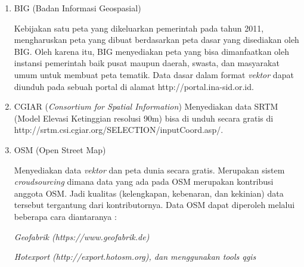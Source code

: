 \begin{enumerate}[A.]
\begin{enumerate}

\item BIG (Badan Informasi Geospasial)

Kebijakan satu peta yang dikeluarkan pemerintah pada tahun 2011, mengharuskan peta yang dibuat berdasarkan peta dasar yang disediakan oleh BIG. Oleh karena itu, BIG menyediakan peta yang bisa dimanfaatkan oleh instansi pemerintah baik pusat maupun daerah, swasta, dan masyarakat umum untuk membuat peta tematik. Data dasar dalam format \textit{vektor} dapat diunduh pada sebuah portal di alamat http://portal.ina-sid.or.id.

\item CGIAR (\textit{Consortium for Spatial Information}) Menyediakan data SRTM (Model Elevasi Ketinggian resolusi 90m) bisa di unduh secara gratis di http://srtm.csi.cgiar.org/SELECTION/inputCoord.asp/.

\item OSM (Open Street Map)

Menyediakan data \textit{vektor} dan peta dunia secara gratis. Merupakan sistem \textit{croudsourcing} dimana data yang ada pada OSM merupakan kontribusi anggota OSM. Jadi kualitas (kelengkapan, kebenaran, dan kekinian) data tersebut tergantung dari kontributornya. Data OSM dapat diperoleh melalui beberapa cara diantaranya :

\textit{Geofabrik (https://www.geofabrik.de)}

\textit{Hotexport (http://export.hotosm.org), dan menggunakan tools qgis}

\end{enumerate}

\end{enumerate}